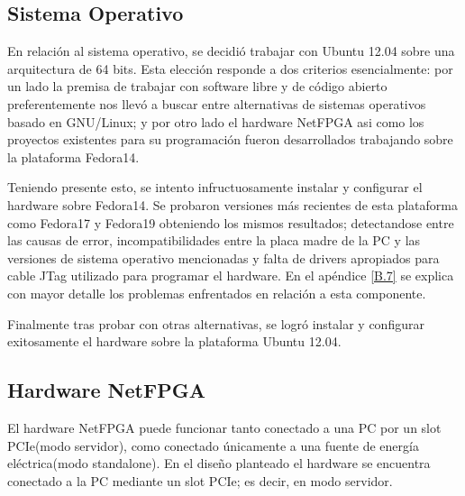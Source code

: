 \subsection{Sistema Operativo}
En relación al sistema operativo, se decidió trabajar con Ubuntu 12.04 sobre una arquitectura de 64 bits. Esta elecci\'on responde a dos criterios esencialmente: por un lado la premisa de trabajar con software libre y de c\'odigo abierto preferentemente nos llev\'o a buscar entre alternativas de sistemas operativos basado en GNU/Linux; y por otro lado el hardware NetFPGA asi como los proyectos existentes para su programaci\'on fueron desarrollados trabajando sobre la plataforma Fedora14. 

Teniendo presente esto, se intento infructuosamente instalar y configurar el hardware sobre Fedora14. Se probaron versiones m\'as recientes de esta plataforma como Fedora17 y Fedora19 obteniendo los mismos resultados; detectandose entre las causas de error, incompatibilidades entre la placa madre de la PC y las versiones de sistema operativo mencionadas y falta de drivers apropiados para cable JTag utilizado para programar el hardware. En el apéndice \ref{B.7} se explica con mayor detalle los problemas enfrentados en relaci\'on a esta componente.

Finalmente tras probar con otras alternativas, se logr\'o instalar y configurar exitosamente el hardware sobre la plataforma Ubuntu 12.04.

\subsection{Hardware NetFPGA}

El hardware NetFPGA puede funcionar tanto conectado a una PC por un slot PCIe(modo servidor), como conectado \'unicamente a una fuente de energ\'ia el\'ectrica(modo standalone). En el dise\~no planteado el hardware se encuentra conectado a la PC mediante un slot PCIe; es decir, en modo servidor.


